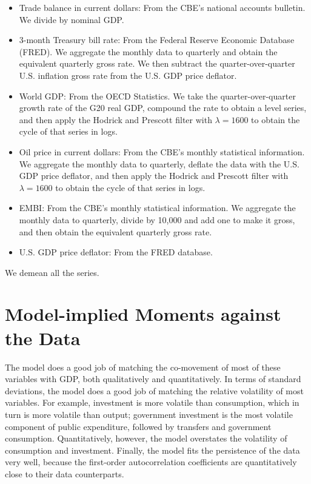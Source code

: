 \documentclass[12pt]{article}
\begin{document}
\begin{itemize}
    \item Trade balance in current dollars: From the CBE's national accounts bulletin. We divide by nominal GDP.
    \item 3-month Treasury bill rate: From the Federal Reserve Economic Database (FRED). We aggregate the monthly data to quarterly and obtain the equivalent quarterly gross rate. We then subtract the quarter-over-quarter U.S. inflation gross rate from the U.S. GDP price deflator.
    \item World GDP: From the OECD Statistics. We take the quarter-over-quarter growth rate of the G20 real GDP, compound the rate to obtain a level series, and then apply the Hodrick and Prescott filter with $\lambda=1600$ to obtain the cycle of that series in logs.
    \item Oil price in current dollars: From the CBE's monthly statistical information. We aggregate the monthly data to quarterly, deflate the data with the U.S. GDP price deflator, and then apply the Hodrick and Prescott filter with $\lambda=1600$ to obtain the cycle of that series in logs.
    \item EMBI: From the CBE's monthly statistical information. We aggregate the monthly data to quarterly, divide by 10,000 and add one to make it gross, and then obtain the equivalent quarterly gross rate.
    \item U.S. GDP price deflator: From the FRED database.
\end{itemize}
We demean all the series.

\section{Model-implied Moments against the Data}\label{app:moments}
The model does a good job of matching the co-movement of most of these variables with GDP, both qualitatively and quantitatively. In terms of standard deviations, the model does a good job of matching the relative volatility of most variables. For example, investment is more volatile than consumption, which in turn is more volatile than output; government investment is the most volatile component of public expenditure, followed by transfers and government consumption. Quantitatively, however, the model overstates the volatility of consumption and investment. Finally, the model fits the persistence of the data very well, because the first-order autocorrelation coefficients are quantitatively close to their data counterparts.
\end{document}
